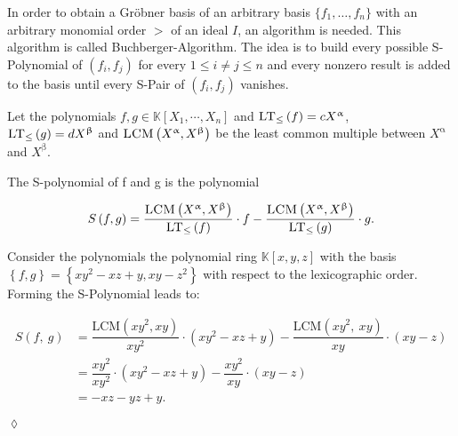 In order to obtain a Gröbner basis of an arbitrary basis $\{f_{1}, \ldots , f_{n}\}$ with an arbitrary monomial order $>$ of an ideal $I$, an algorithm is needed. This algorithm is called Buchberger-Algorithm. The idea is to build every possible S-Polynomial of $\left( f_{i},f_{j}\right) $ for every $ 1 \leq i \neq j \leq n $ and every nonzero result is added to the basis until every S-Pair of $\left( f_{i},f_{j}\right) $ vanishes.

Let the polynomials $f,g \in \mathbb{K}\left[X_{1}, \cdots, X_{n}\right] $ and $\textsc{LT}_{\leq}\left(f \right) = cX^{\upalpha} $, \\  $\textsc{LT}_{\leq}\left(g \right) = dX^{\upbeta} $ and $\textsc{LCM}\left( X^{\upalpha},X^{\upbeta}\right) $ be the least common multiple between $X^{\upalpha}$ and $X^{\upbeta}$. 

\begin{env_definition}[S-Polynomial]
\cite{KHZ} The S-polynomial of f and g is the polynomial

\[ S\left( f,g\right) = \frac{\textsc{LCM}\left( X^{\upalpha}, X^{\upbeta}\right) }{\textsc{LT}_{\leq}\left( f\right) } \cdot f - \frac{ \textsc{LCM}\left( X^{\upalpha}, X^{\upbeta}\right) }{\textsc{LT}_{\leq}\left( g\right) } 
\cdot g. \]


\end{env_definition}

\newpage

\begin{env_example}\normalfont
Consider the polynomials the polynomial ring $\mathbb{K}\left[ x,y,z\right] $ with
the basis $\left\lbrace f,g\right\rbrace = \left\lbrace xy^{2}-xz+y,xy-z^{2} \right\rbrace $ with respect to the lexicographic order.\\
Forming the S-Polynomial leads to:

\begin{align*}
 S \left(f,~g\right) &= \dfrac{\textrm{LCM}\left( xy^{2}, xy \right) } {xy^{2} } \cdot \left(  xy^{2}-xz+y\right) - \dfrac{\textrm{LCM}\left( xy^{2},~xy \right) } {xy } \cdot \left( xy-z \right) \\ 
 &= \dfrac{xy^{2}}{xy^{2}} \cdot \left( xy^{2}-xz+y\right) - \dfrac{xy^{2}}{xy} \cdot \left( xy-z\right) \\
 &= -xz-yz+y. 
\end{align*}


\begin{flushright}
$\lozenge$
\end{flushright} 
\end{env_example}


